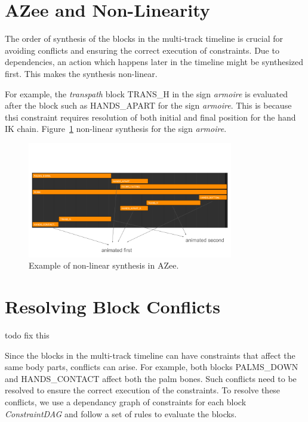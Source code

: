 \documentclass[../../main.tex]{subfiles}
\begin{document}
\section{AZee and Non-Linearity}
\label{ch:multi_track:azee_nl}

The order of synthesis of the blocks in the multi-track timeline is crucial for avoiding conflicts and ensuring the correct execution of constraints. Due to dependencies, an action which happens later in the timeline might be synthesized first. This makes the synthesis non-linear. 

For example, the \emph{transpath} block TRANS\_H in the sign \emph{armoire} is evaluated after the block such as HANDS\_APART for the sign \emph{armoire}. This is because thsi constraint requires resolution of both initial and final position for the hand IK chain. Figure~\ref{fig:example_azee_non_linear} non-linear synthesis for the sign \emph{armoire}.

\begin{figure}[h]
    \centering
    \includegraphics[width=0.8\textwidth]{chapters/multi_track/images/example_azee_non_linear.png}
    \caption{Example of non-linear synthesis in AZee.}
    \label{fig:example_azee_non_linear}
\end{figure}

\section{Resolving Block Conflicts}
\label{ch:multi_track:resolve_conflitcs}

todo fix this

Since the blocks in the multi-track timeline can have constraints that affect the same body parts, conflicts can arise. For example, both blocks PALMS\_DOWN and HANDS\_CONTACT affect both the palm bones. Such conflicts need to be resolved to ensure the correct execution of the constraints. To resolve these conflicts, we use a dependancy graph of constraints for each block \emph{ConstraintDAG} and follow a set of rules to evaluate the blocks.
\end{document}
